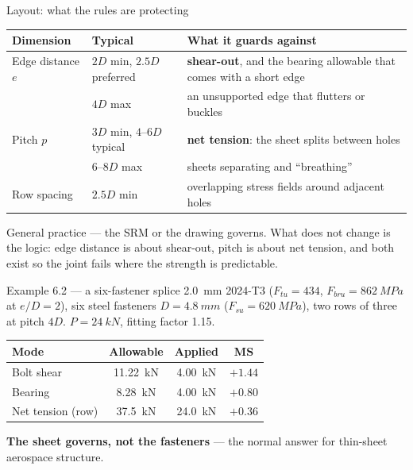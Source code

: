 \documentclass[aspectratio=169,10pt]{beamer}
\begin{document}
\begin{frame}{Layout: what the rules are protecting}
\centering\footnotesize
\begin{tabular}{@{}llp{6.9cm}@{}}
\toprule
Dimension & Typical & What it guards against\\
\midrule
Edge distance $e$ & $2D$ min, $2.5D$ preferred & \textbf{shear-out}, and the bearing allowable that
  comes with a short edge\\[3pt]
 & $4D$ max & an unsupported edge that flutters or buckles\\[3pt]
Pitch $p$ & $3D$ min, $4$--$6D$ typical & \textbf{net tension}: the sheet splits between holes\\[3pt]
 & $6$--$8D$ max & sheets separating and ``breathing''\\[3pt]
Row spacing & $2.5D$ min & overlapping stress fields around adjacent holes\\
\bottomrule
\end{tabular}
\vfill
\raggedright
General practice --- the SRM or the drawing governs. What does not change is the logic:
\alert{edge distance is about shear-out, pitch is about net tension}, and both exist so the joint
fails where the strength is predictable.
\end{frame}

\begin{frame}{Example 6.2 --- a six-fastener splice}
\SI{2.0}{mm} 2024-T3 ($F_{tu}=434$, $F_{bru}=\SI{862}{MPa}$ at $e/D=2$), six steel fasteners
$D=\SI{4.8}{mm}$ ($F_{su}=\SI{620}{MPa}$), two rows of three at pitch $4D$. $P=\SI{24}{kN}$,
fitting factor 1.15.
\vfill
\centering\small
\begin{tabular}{@{}lccc@{}}
\toprule
Mode & Allowable & Applied & MS\\
\midrule
Bolt shear & \SI{11.22}{kN} & \SI{4.00}{kN} & $+1.44$\\
Bearing & \SI{8.28}{kN} & \SI{4.00}{kN} & $+0.80$\\
Net tension (row) & \SI{37.5}{kN} & \SI{24.0}{kN} & $\mathbf{+0.36}$\\
\bottomrule
\end{tabular}
\vfill
\raggedright
\textbf{The sheet governs, not the fasteners} --- the normal answer for thin-sheet aerospace
structure.
\end{frame}
\end{document}

